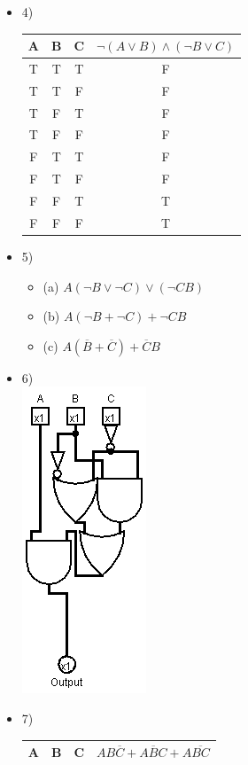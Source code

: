 \documentclass{article}
\begin{document}
\begin{itemize}
\begin{itemize}
		\item
		4)\\
		\begin{tabular}{|c|c|c||c|}
      \hline
      A & B & C & $\lnot (A\lor B)\land (\lnot B \lor C)$\\ \hline
      T & T & T & F \\
      T & T & F & F \\
      T & F & T & F \\
      T & F & F & F \\
      F & T & T & F \\
      F & T & F & F \\
      F & F & T & T \\
      F & F & F & T \\ \hline
    \end{tabular}
    \item
		5)
		\begin{itemize}
			\item
			(a)
			$A(\lnot B \lor \lnot C)\lor (\lnot CB)$
			\item
			(b)
			$A(\lnot B+\lnot C)+\lnot CB$
			\item
			(c)
			$A(\overline{B}+\overline{C})+\overline{C}B$
		\end{itemize}
		\item
		6)\\
    \includegraphics[scale=0.5]{chapter2problem6.png}
		\item
		7)\\
		\begin{tabular}{|c|c|c||c|}
      \hline
      A & B & C & $AB\overline{C}+A\overline{B}C+A\overline{BC}$ \\ \hline

\end{tabular}
\end{itemize}
\end{itemize}
\end{document}
